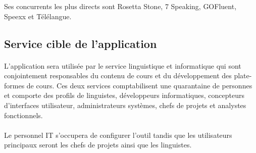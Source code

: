 Ses concurrents les plus directs sont Rosetta Stone, 7 Speaking, GOFluent, Speexx et Télélangue.

\subsection{Service cible de l'application}
\label{ssec:target-service}
\paragraph{}
L'application sera utilisée par le service linguistique et informatique qui sont conjointement responsables du contenu de cours
et du développement des plate-formes de cours.
Ces deux services comptabilisent une quarantaine de personnes et comporte des profils de linguistes, développeurs informatiques,
concepteurs d'interfaces utilisateur, administrateurs systèmes, chefs de projets et analystes fonctionnels.

\paragraph{}
Le personnel IT s'occupera de configurer l'outil tandis que les utilisateurs principaux seront les chefs de projets ainsi que les linguistes.
